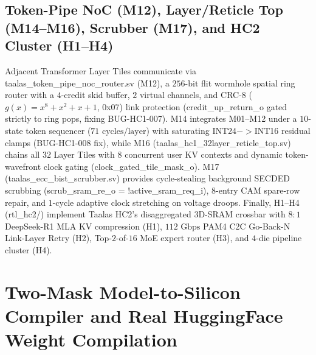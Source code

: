 \documentclass[10pt,journal,compsoc]{IEEEtran}
\def\texttt#1{#1}%
\def\to{->}%
\begin{document}
\subsection{Token-Pipe NoC (\texttt{M12}), Layer/Reticle Top (\texttt{M14}--\texttt{M16}), Scrubber (\texttt{M17}), and HC2 Cluster (\texttt{H1}--\texttt{H4})}
Adjacent Transformer Layer Tiles communicate via \texttt{taalas\_token\_pipe\_noc\_router.sv} (\texttt{M12}), a $256\text{-bit}$ flit wormhole spatial ring router with a $4$-credit skid buffer, $2$ virtual channels, and \texttt{CRC-8} ($g(x)=x^8+x^2+x+1$, \texttt{0x07}) link protection (\texttt{credit\_up\_return\_o} gated strictly to ring pops, fixing \texttt{BUG-HC1-007}). \texttt{M14} integrates \texttt{M01}--\texttt{M12} under a $10$-state token sequencer ($71\text{ cycles/layer}$) with saturating \texttt{INT24}$\to$\texttt{INT16} residual clamps (\texttt{BUG-HC1-008} fix), while \texttt{M16} (\texttt{taalas\_hc1\_32layer\_reticle\_top.sv}) chains all $32$ Layer Tiles with $8$ concurrent user KV contexts and dynamic token-wavefront clock gating (\texttt{clock\_gated\_tile\_mask\_o}). \texttt{M17} (\texttt{taalas\_ecc\_bist\_scrubber.sv}) provides cycle-stealing background SECDED scrubbing (\texttt{scrub\_sram\_re\_o = !active\_sram\_req\_i}), $8$-entry CAM spare-row repair, and $1$-cycle adaptive clock stretching on voltage droops. Finally, \texttt{H1}--\texttt{H4} (\texttt{rtl\_hc2/}) implement Taalas HC2's disaggregated 3D-SRAM crossbar with $8:1$ DeepSeek-R1 MLA KV compression (\texttt{H1}), $112\text{ Gbps}$ PAM4 C2C Go-Back-N Link-Layer Retry (\texttt{H2}), Top-$2$-of-$16$ MoE expert router (\texttt{H3}), and $4$-die pipeline cluster (\texttt{H4}).

\section{Two-Mask Model-to-Silicon Compiler and Real HuggingFace Weight Compilation}
\end{document}
